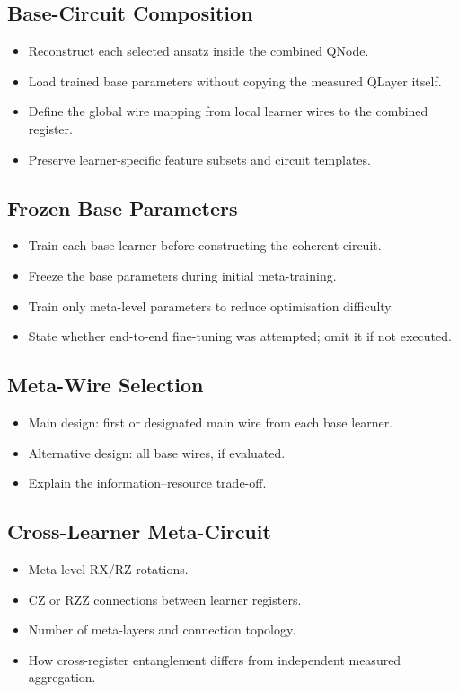 \documentclass[]{UCD_CS_MSc_AAI_Report}
\begin{document}
\subsection{Base-Circuit Composition}
\begin{itemize}
    \item Reconstruct each selected ansatz inside the combined QNode.
    \item Load trained base parameters without copying the measured QLayer itself.
    \item Define the global wire mapping from local learner wires to the combined register.
    \item Preserve learner-specific feature subsets and circuit templates.
\end{itemize}

\subsection{Frozen Base Parameters}
\begin{itemize}
    \item Train each base learner before constructing the coherent circuit.
    \item Freeze the base parameters during initial meta-training.
    \item Train only meta-level parameters to reduce optimisation difficulty.
    \item State whether end-to-end fine-tuning was attempted; omit it if not executed.
\end{itemize}

\subsection{Meta-Wire Selection}
\begin{itemize}
    \item Main design: first or designated main wire from each base learner.
    \item Alternative design: all base wires, if evaluated.
    \item Explain the information--resource trade-off.
\end{itemize}

\subsection{Cross-Learner Meta-Circuit}
\begin{itemize}
    \item Meta-level RX/RZ rotations.
    \item CZ or RZZ connections between learner registers.
    \item Number of meta-layers and connection topology.
    \item How cross-register entanglement differs from independent measured aggregation.
\end{itemize}
\end{document}
